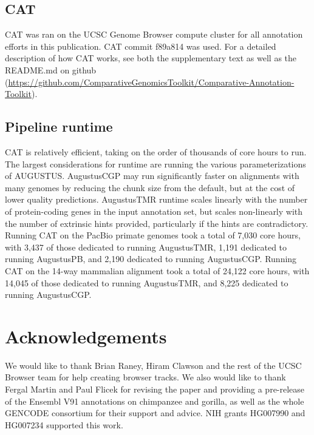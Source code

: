 \documentclass[fleqn,10pt]{wlscirep}
\begin{document}
\subsection*{CAT}

CAT was ran on the UCSC Genome Browser compute cluster for all annotation efforts in this publication. CAT commit f89a814 was used. For a detailed description of how CAT works, see both the supplementary text as well as the README.md on github (\url{https://github.com/ComparativeGenomicsToolkit/Comparative-Annotation-Toolkit}). 

\subsection*{Pipeline runtime}

CAT is relatively efficient, taking on the order of thousands of core hours to run. The largest considerations for runtime are running the various parameterizations of AUGUSTUS. AugustusCGP may run significantly faster on alignments with many genomes by reducing the chunk size from the default, but at the cost of lower quality predictions. AugustusTMR runtime scales linearly with the number of protein-coding genes in the input annotation set, but scales non-linearly with the number of extrinsic hints provided, particularly if the hints are contradictory. 
Running CAT on the PacBio primate genomes took a total of 7,030 core hours, with 3,437 of those dedicated to running AugustusTMR, 1,191 dedicated to running AugustusPB, and 2,190 dedicated to running AugustusCGP. Running CAT on the 14-way mammalian alignment took a total of 24,122 core hours, with 14,045 of those dedicated to running AugustusTMR, and 8,225 dedicated to running AugustusCGP.

\section*{Acknowledgements}

We would like to thank Brian Raney, Hiram Clawson and the rest of the UCSC Browser team for help creating browser tracks. We also would like to thank Fergal Martin and Paul Flicek for revising the paper and providing a pre-release of the Ensembl V91 annotations on chimpanzee and gorilla, as well as the whole GENCODE consortium for their support and advice. NIH grants HG007990 and HG007234 supported this work.


\clearpage
\end{document}
